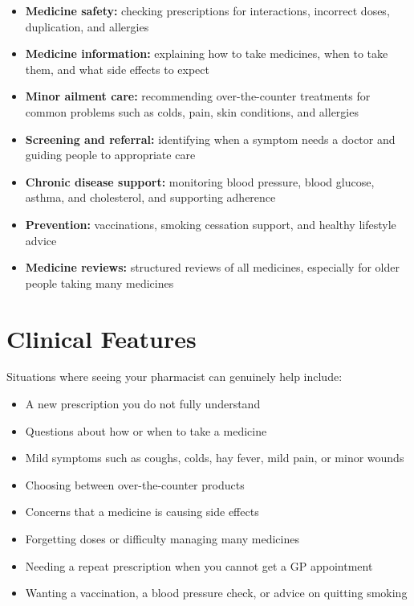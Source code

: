 \begin{itemize}
    \item \textbf{Medicine safety:} checking prescriptions for interactions, incorrect doses, duplication, and allergies
    \item \textbf{Medicine information:} explaining how to take medicines, when to take them, and what side effects to expect
    \item \textbf{Minor ailment care:} recommending over-the-counter treatments for common problems such as colds, pain, skin conditions, and allergies
    \item \textbf{Screening and referral:} identifying when a symptom needs a doctor and guiding people to appropriate care
    \item \textbf{Chronic disease support:} monitoring blood pressure, blood glucose, asthma, and cholesterol, and supporting adherence
    \item \textbf{Prevention:} vaccinations, smoking cessation support, and healthy lifestyle advice
    \item \textbf{Medicine reviews:} structured reviews of all medicines, especially for older people taking many medicines
\end{itemize}

\section*{Clinical Features}
Situations where seeing your pharmacist can genuinely help include:

\begin{itemize}
    \item A new prescription you do not fully understand
    \item Questions about how or when to take a medicine
    \item Mild symptoms such as coughs, colds, hay fever, mild pain, or minor wounds
    \item Choosing between over-the-counter products
    \item Concerns that a medicine is causing side effects
    \item Forgetting doses or difficulty managing many medicines
    \item Needing a repeat prescription when you cannot get a GP appointment
    \item Wanting a vaccination, a blood pressure check, or advice on quitting smoking
\end{itemize}

